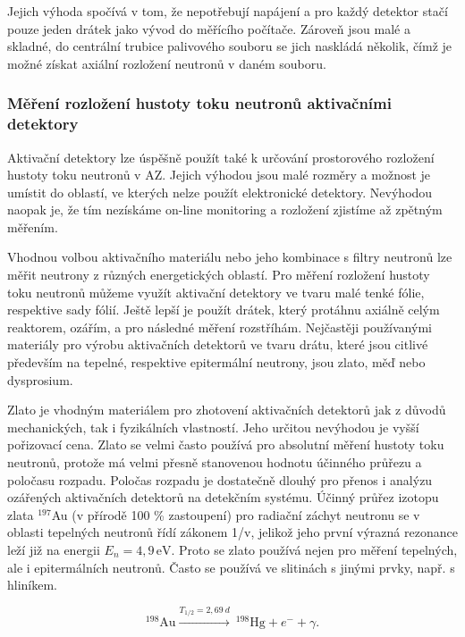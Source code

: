 Jejich výhoda spočívá v tom, že nepotřebují napájení a pro každý detektor stačí pouze jeden drátek jako vývod do měřícího počítače. Zároveň jsou malé a skladné, do centrální trubice palivového souboru se jich naskládá několik, čímž je možné získat axiální rozložení neutronů v daném souboru.

\subsubsection{Měření rozložení hustoty toku neutronů aktivačními detektory}

Aktivační detektory lze úspěšně použít také k určování prostorového rozložení hustoty toku neutronů v AZ. Jejich výhodou jsou malé rozměry a možnost je umístit do oblastí, ve kterých nelze použít elektronické detektory. Nevýhodou naopak je, že tím nezískáme on-line monitoring a rozložení zjistíme až zpětným měřením.

Vhodnou volbou aktivačního materiálu nebo jeho kombinace s filtry neutronů lze měřit neutrony z různých energetických oblastí. Pro měření rozložení hustoty toku neutronů můžeme využít aktivační detektory ve tvaru malé tenké fólie, respektive sady fólií. Ještě lepší je použít drátek, který protáhnu axiálně celým reaktorem, ozářím, a pro následné měření rozstříhám. Nejčastěji používanými materiály pro výrobu aktivačních detektorů ve tvaru drátu, které jsou citlivé především na tepelné, respektive epitermální neutrony, jsou zlato, měď nebo dysprosium.

Zlato je vhodným materiálem pro zhotovení aktivačních detektorů jak z důvodů mechanických, tak i fyzikálních vlastností. Jeho určitou nevýhodou je vyšší pořizovací cena. Zlato se velmi často používá pro absolutní měření hustoty toku neutronů, protože má velmi přesně stanovenou hodnotu účinného průřezu a poločasu rozpadu. Poločas rozpadu je dostatečně dlouhý pro přenos i analýzu ozářených aktivačních detektorů na detekčním systému. Účinný průřez izotopu zlata $^{197}$Au (v přírodě 100 \% zastoupení) pro radiační záchyt neutronu se v oblasti tepelných neutronů řídí zákonem 1/v, jelikož jeho první výrazná rezonance leží již na energii $E_n = 4{,}9 \, \text{eV}$. Proto se zlato používá nejen pro měření tepelných, ale i epitermálních neutronů. Často se používá ve slitinách s jinými prvky, např. s hliníkem.

\begin{equation*}
    ^{198}\text{Au} \xrightarrow{T_{1/2} = 2,69\ d}\ ^{198}\text{Hg} + e^- + \gamma.
\end{equation*}

